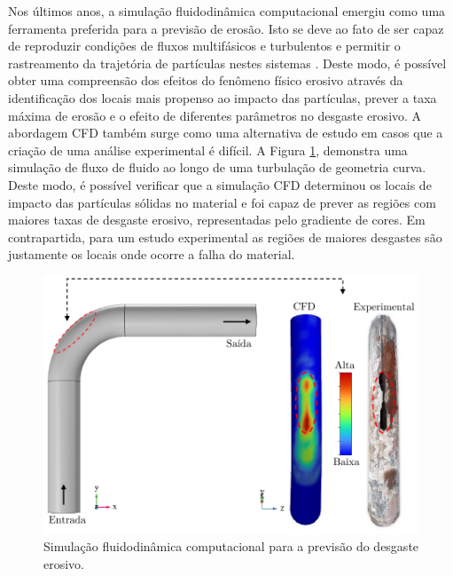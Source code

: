 Nos últimos anos, a simulação fluidodinâmica computacional emergiu como uma ferramenta preferida para a previsão de erosão. Isto se deve ao fato de ser capaz de reproduzir condições de fluxos multifásicos e turbulentos e permitir o rastreamento da trajetória de partículas nestes sistemas \cite{yuhan} \cite {Parsi}. Deste modo, é possível obter uma compreensão dos efeitos do fenômeno físico erosivo através da identificação dos locais mais propenso ao impacto das partículas, prever a taxa máxima de erosão e o efeito de diferentes parâmetros no desgaste erosivo. A abordagem CFD também surge como uma alternativa de estudo em casos que a criação de uma análise experimental é difícil. A Figura \ref{fig:cfderosao}, demonstra uma simulação de fluxo de fluido ao longo de uma turbulação de geometria curva. Deste modo, é possível verificar que a simulação CFD determinou os locais de impacto das partículas sólidas no material e foi capaz de prever as regiões com maiores taxas de desgaste erosivo, representadas pelo gradiente de cores. Em contrapartida, para um estudo experimental as regiões de maiores desgastes são justamente os locais onde ocorre a falha do material.

\begin{figure}[H]
    \centering
    \includegraphics{Figuras/cfderosao.pdf}
    \caption{Simulação fluidodinâmica computacional para a previsão do desgaste erosivo.}
    \label{fig:cfderosao}
\end{figure}

